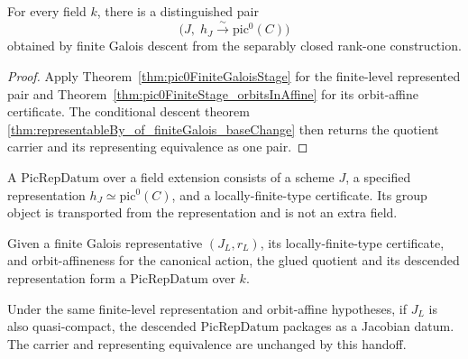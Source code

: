 \begin{definition}
  \label{def:pic0_representableBy}
  \notready
  For every field \(k\), there is a distinguished pair
  \[
    \bigl(J,\;h_J\xrightarrow{\ \sim\ }\mathrm{pic}^0(C)\bigr)
  \]
  obtained by finite Galois descent from the separably closed rank-one construction.
\end{definition}
\begin{proof}
  Apply Theorem~\ref{thm:pic0FiniteGaloisStage} for the finite-level represented pair and
  Theorem~\ref{thm:pic0FiniteStage_orbitsInAffine} for its orbit-affine certificate.  The
  conditional descent theorem
  \ref{thm:representableBy_of_finiteGalois_baseChange} then returns the quotient carrier and
  its representing equivalence as one pair.
\end{proof}

\begin{definition}
  \label{def:picRepDatum}
  \leanok
  A \(\mathrm{PicRepDatum}\) over a field extension consists of a scheme \(J\), a specified
  representation \(h_J\simeq\mathrm{pic}^0(C)\), and a locally-finite-type certificate.  Its
  group object is transported from the representation and is not an extra field.
\end{definition}

\begin{definition}
  \label{def:picRepDatum_finiteGaloisDescent}
  \leanok
  Given a finite Galois representative \((J_L,r_L)\), its locally-finite-type certificate,
  and orbit-affineness for the canonical action, the glued quotient and its descended
  representation form a \(\mathrm{PicRepDatum}\) over \(k\).
\end{definition}

\begin{definition}
  \label{def:jacobianData_finiteGaloisDescent}
  \leanok
  Under the same finite-level representation and orbit-affine hypotheses, if \(J_L\) is also
  quasi-compact, the descended \(\mathrm{PicRepDatum}\) packages as a Jacobian datum.  The
  carrier and representing equivalence are unchanged by this handoff.
\end{definition}

